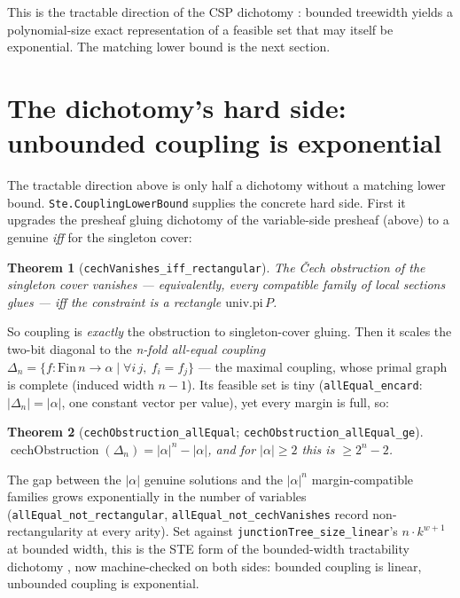 \documentclass[11pt]{article}
\newtheorem{theorem}{Theorem}
\newcommand{\lean}[1]{\texttt{#1}}
\begin{document}
\noindent This is the tractable direction of the CSP dichotomy
\citep{freuder1982backtrack,grohe2007complexity,dechter2003constraint}:
bounded treewidth yields a polynomial-size exact representation of a
feasible set that may itself be exponential.  The matching lower bound
is the next section.

\section{The dichotomy's hard side: unbounded coupling is exponential}

The tractable direction above is only half a dichotomy without a
matching lower bound.  \lean{Ste.CouplingLowerBound} supplies the
concrete hard side.  First it upgrades the presheaf gluing dichotomy of
the variable-side presheaf (above) to a genuine \emph{iff} for the singleton
cover:

\begin{theorem}[\lean{cechVanishes\_iff\_rectangular}]
The \v{C}ech obstruction of the singleton cover vanishes ---
equivalently, every compatible family of local sections glues --- iff
the constraint is a rectangle $\mathrm{univ.pi}\,P$.
\end{theorem}

\noindent So coupling is \emph{exactly} the obstruction to
singleton-cover gluing.  Then it scales the two-bit diagonal to the
\emph{n-fold all-equal coupling} $\Delta_n = \{f : \mathrm{Fin}\,n \to
\alpha \mid \forall i\,j,\ f_i = f_j\}$ --- the maximal coupling, whose
primal graph is complete (induced width $n-1$).  Its feasible set is
tiny (\lean{allEqual\_encard}: $|\Delta_n| = |\alpha|$, one constant vector
per value), yet every margin is full, so:

\begin{theorem}[\lean{cechObstruction\_allEqual};
\lean{cechObstruction\_allEqual\_ge}]
$\operatorname{cechObstruction}(\Delta_n) = |\alpha|^n - |\alpha|$, and
for $|\alpha| \ge 2$ this is $\ge 2^n - 2$.
\end{theorem}

\noindent The gap between the $|\alpha|$ genuine solutions and the
$|\alpha|^n$ margin-compatible families grows exponentially in the
number of variables (\lean{allEqual\_not\_rectangular},
\lean{allEqual\_not\_cechVanishes} record non-rectangularity at every
arity).  Set against \lean{junctionTree\_size\_linear}'s $n \cdot
k^{w+1}$ at bounded width, this is the STE form of the bounded-width
tractability dichotomy \citep{dechter2003constraint}, now machine-checked
on both sides: bounded coupling is linear, unbounded coupling is
exponential.
\end{document}
